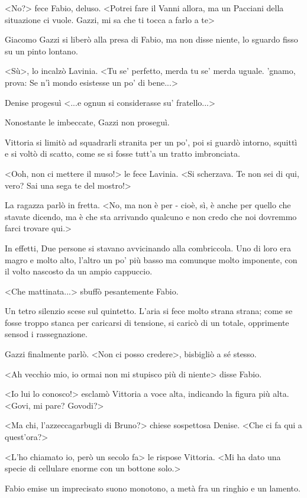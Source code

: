 <No?> fece Fabio, deluso. <Potrei fare il Vanni allora, ma un  Pacciani della situazione ci vuole. Gazzi, mi sa che ti tocca a farlo a te>

Giacomo Gazzi si liberò alla presa di Fabio, ma non disse niente, lo sguardo fisso su un pinto lontano. 

<Sù>, lo incalzò Lavinia. <Tu se' perfetto, merda tu se' merda uguale. 'gnamo, prova: Se n'ì mondo esistesse un po' di bene...>

Denise progesuì <...e ognun si considerasse su' fratello...>

Nonostante le imbeccate, Gazzi non proseguì.

Vittoria si limitò ad squadrarli stranita per un po', poi si guardò intorno, squittì e si voltò di scatto, come se si fosse tutt'a un tratto imbronciata.

<Ooh, non ci mettere il muso!> le fece Lavinia. <Si scherzava. Te non sei di qui, vero? Sai una sega te del mostro!>

La ragazza parlò in fretta. <No, ma non è per - cioè, sì, è anche per quello che stavate dicendo, ma è che sta arrivando qualcuno e non credo che noi dovremmo farci trovare qui.> 

In effetti, Due persone si stavano avvicinando alla combriccola. Uno di loro era magro e molto alto, l'altro un po' più basso ma comunque molto imponente, con il volto nascosto da un ampio cappuccio.

<Che mattinata...> sbuffò pesantemente Fabio.

Un tetro silenzio scese sul quintetto. L'aria si fece molto strana strana; come se fosse troppo stanca per caricarsi di tensione, si caricò di un totale, opprimente sensod i rassegnazione.

Gazzi finalmente parlò. <Non ci posso credere>, bisbigliò a sé stesso.

<Ah vecchio mio, io ormai non mi stupisco più di niente> disse Fabio.

<Io lui lo conosco!> esclamò Vittoria a voce alta, indicando la figura più alta. <Govi, mi pare? Govodi?>

<Ma chi, l'azzeccagarbugli di Bruno?> chiese sospettosa Denise. <Che ci fa qui a quest'ora?>

<L'ho chiamato io, però un secolo fa> le rispose Vittoria. <Mi ha dato una specie di cellulare enorme con un bottone solo.>

Fabio emise un imprecisato suono monotono, a metà fra un ringhio e un lamento.

